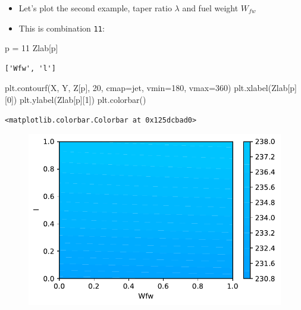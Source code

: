 \documentclass[
  letterpaper,
  DIV=11,
  numbers=noendperiod]{scrreprt}
\newenvironment{Shaded}{\begin{snugshade}}{\end{snugshade}}
\newcommand{\DecValTok}[1]{\textcolor[rgb]{0.68,0.00,0.00}{#1}}
\newcommand{\NormalTok}[1]{\textcolor[rgb]{0.00,0.23,0.31}{#1}}
\newcommand{\OperatorTok}[1]{\textcolor[rgb]{0.37,0.37,0.37}{#1}}
\newcommand{\StringTok}[1]{\textcolor[rgb]{0.13,0.47,0.30}{#1}}
\providecommand{\tightlist}{%
  \setlength{\itemsep}{0pt}\setlength{\parskip}{0pt}}\usepackage{longtable,booktabs,array}
\begin{document}
\begin{itemize}
\tightlist
\item
  Let's plot the second example, taper ratio \(\lambda\) and fuel weight
  \(W_{fw}\)
\item
  This is combination \texttt{11}:
\end{itemize}

\begin{Shaded}
\begin{Highlighting}[]
\NormalTok{p }\OperatorTok{=} \DecValTok{11}
\NormalTok{Zlab[p]}
\end{Highlighting}
\end{Shaded}

\begin{verbatim}
['Wfw', 'l']
\end{verbatim}

\begin{Shaded}
\begin{Highlighting}[]
\NormalTok{plt.contourf(X, Y, Z[p], }\DecValTok{20}\NormalTok{, cmap}\OperatorTok{=}\StringTok{\textquotesingle{}jet\textquotesingle{}}\NormalTok{, vmin}\OperatorTok{=}\DecValTok{180}\NormalTok{, vmax}\OperatorTok{=}\DecValTok{360}\NormalTok{)}
\NormalTok{plt.xlabel(Zlab[p][}\DecValTok{0}\NormalTok{])}
\NormalTok{plt.ylabel(Zlab[p][}\DecValTok{1}\NormalTok{])}
\NormalTok{plt.colorbar()}
\end{Highlighting}
\end{Shaded}

\begin{verbatim}
<matplotlib.colorbar.Colorbar at 0x125dcbad0>
\end{verbatim}

\begin{figure}[H]

{\centering \includegraphics{002_awwe_files/figure-pdf/cell-13-output-2.pdf}

}

\end{figure}
\end{document}
